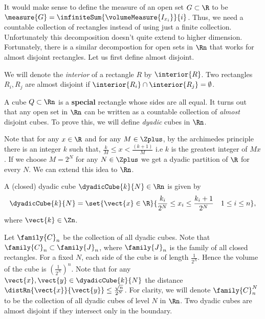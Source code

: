 It would make sense to define the measure of an open set $G \subset \R$ to be $\measure{G} =
\infiniteSum{\volumeMeasure{I_{x_i}}}{i}$. Thus, we need a countable collection of rectangles instead of using
just a finite collection. Unfortunately this decomposition doesn't quite extend to higher dimension.
Fortunately, there is a similar decompostion for open sets in $\Rn$ that works for almost disjoint rectangles.
Let us first define almost disjoint.

\begin{Definition}[name=Almost disjoint rectangles] 
    We will denote the \emph{interior} of a rectangle $R$ by $\interior{R}$. Two rectangles
    $R_i,R_j$ are almost disjoint if $\interior{R_i}\cap\interior{R_j} = \emptyset$.
\end{Definition}
A cube $Q \subset \Rn$ is a \textbf{special} rectangle whose sides are all equal. It turns out that any open
set in $\Rn$ can be written as a countable collection of \emph{almost} disjoint cubes. To prove this, we will
define \emph{dyadic} cubes in $\Rn$.

Note that for any $x \in \R$ and for any $M \in \Zplus$, by the archimedes principle there is
an integer $k$ such that, $\frac{k}{M} \leq x < \frac{(k+1)}{M}$ i.e $k$ is the greatest integer of $Mx$. If we
choose $M = 2^N$ for any $N \in \Zplus$ we get a dyadic partition of $\R$ for every $N$. We can
extend this idea to $\Rn$.
\begin{Definition}[name=Dyadic cube]\label{def:dyadic_cube}
    A (closed) dyadic cube $\dyadicCube{k}{N} \in \Rn$ is given by 
    \[\dyadicCube{k}{N} = \set{\vect{x} \in \R}{\frac{k_i}{2^N} \leq x_i \leq 
	    \frac{k_i+1}{2^N} \quad 1\leq i \leq n},\] 
    where $\vect{k} \in \Zn$.
\end{Definition}
Let $\family{C}_n$ be the collection of all dyadic cubes. Note that $\family{C}_n \subset
\family{J}_{n}$, where $\family{J}_n$ is the family of all closed rectangles. For a fixed $N$, each
side of the cube is of length $\frac{1}{2^N}$. Hence the volume of the cube is 
${(\frac{1}{2^N})}^n$. Note that for any $\vect{x},\vect{y} \in \dyadicCube{k}{N}$ the distance
$\distRn{\vect{x}}{\vect{y}} \leq \frac{\sqrt{n}}{2^N}$. For clarity, we will denote $\family{C}_n^N$
to be the collection of all dyadic cubes of level $N$ in $\Rn$. Two dyadic cubes are almost disjoint
if they intersect only in the boundary.

